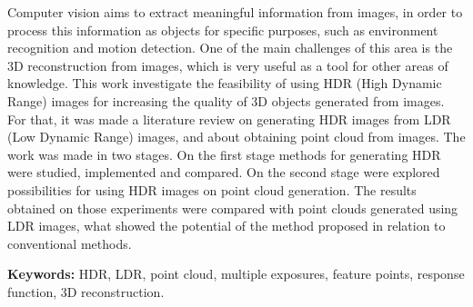 Computer vision aims to extract meaningful information from images, in order to process this information as objects for specific purposes, such as environment recognition and motion detection. One of the main challenges of this area is the 3D reconstruction from images, which is very useful as a tool for other areas of knowledge. This work investigate the feasibility of using HDR (High Dynamic Range) images for increasing the quality of 3D objects generated from images. For that, it was made a literature review on generating HDR images from LDR (Low Dynamic Range) images, and about obtaining point cloud from images. The work was made in two stages. On the first stage methods for generating HDR were studied, implemented and compared. On the second stage were explored possibilities for using HDR images on point cloud generation. The results obtained on those experiments were compared with point clouds generated using LDR images, what showed the potential of the method proposed in relation to conventional methods.

\textbf{Keywords:} HDR, LDR, point cloud, multiple exposures, feature points, response function, 3D reconstruction. 